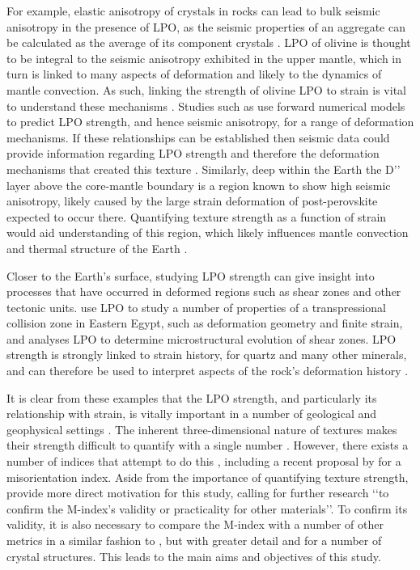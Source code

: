 \documentclass[a4paper,12pt,twoside]{report}
\numberwithin{equation}{chapter}
\begin{document}
For example, elastic anisotropy of crystals in rocks can lead to bulk seismic anisotropy in the presence of LPO, as the seismic properties of an aggregate can be calculated as the average of its component crystals \citep{Tommasi1999}. LPO of olivine is thought to be integral to the seismic anisotropy exhibited in the upper mantle, which in turn is linked to many aspects of deformation and likely to the dynamics of mantle convection. As such, linking the strength of olivine LPO to strain is vital to understand these mechanisms \citep[e.g.][]{Warren2008}. Studies such as \cite{Tommasi2000} use forward numerical models to predict LPO strength, and hence seismic anisotropy, for a range of deformation mechanisms. If these relationships can be established then seismic data could provide information regarding LPO strength and therefore the deformation mechanisms that created this texture \citep[see][for details of a number of other approaches to this problem]{Blackman2002}. Similarly, deep within the Earth the D\rq\rq{} layer \citep{Garnero2008} above the core-mantle boundary is a region known to show high seismic anisotropy, likely caused by the large strain deformation of post-perovskite expected to occur there. Quantifying texture strength as a function of strain would aid understanding of this region, which likely influences mantle convection and thermal structure of the Earth \citep{Miyagi2010}. 

Closer to the Earth's surface, studying LPO strength can give insight into processes that have occurred in deformed regions such as shear zones and other tectonic units. \cite{Unzog2000} use LPO to study a number of properties of a transpressional collision zone in Eastern Egypt, such as deformation geometry and finite strain, and \cite{Lloyd2004} analyses LPO to determine microstructural evolution of shear zones. LPO strength is strongly linked to strain history, for quartz and many other minerals, and can therefore be used to interpret aspects of the rock's deformation history \cite{Price1985}.

It is clear from these examples that the LPO strength, and particularly its relationship with strain, is vitally important in a number of geological and geophysical settings \citep[and many more besides, see][for more examples]{Wenk1999}. The inherent three-dimensional nature of textures makes their strength difficult to quantify with a single number \citep{Schaeben2007}. However, there exists a number of indices that attempt to do this \citep[e.g. the texture index][]{bunge1982texture}, including a recent proposal by \cite{Skemer} for a misorientation index. Aside from the importance of quantifying texture strength, \cite{Skemer} provide more direct motivation for this study, calling for further research \lq\lq{}to confirm the M-index's validity or practicality for other materials\rq\rq{}. To confirm its validity, it is also necessary to compare the M-index with a number of other metrics in a similar fashion to \cite{Mainprice}, but with greater detail and for a number of crystal structures. This leads to the main aims and objectives of this study.   
   
\end{document}

